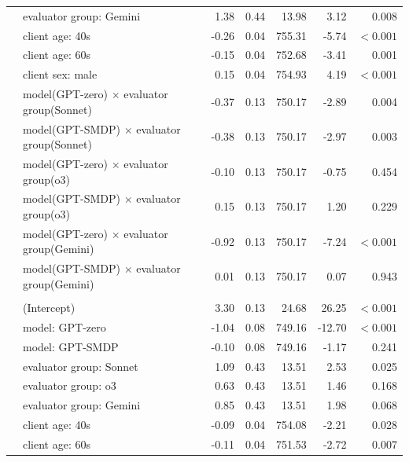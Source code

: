 \documentclass{wiley-article}
\begin{document}
{\begin{longtable}{@{}l p{} rrrrr@{}}
    & evaluator group: Gemini                                 & 1.38 & 0.44 &  13.98 &   3.12 & 0.008 \\
    & client age: 40s                                         &-0.26 & 0.04 & 755.31 &  -5.74 & $<\!0.001$ \\
    & client age: 60s                                         &-0.15 & 0.04 & 752.68 &  -3.41 & 0.001 \\
    & client sex: male                                        & 0.15 & 0.04 & 754.93 &   4.19 & $<\!0.001$ \\
    & model(GPT-zero) $\times$ evaluator group(Sonnet)        &-0.37 & 0.13 & 750.17 &  -2.89 & 0.004 \\
    & model(GPT-SMDP) $\times$ evaluator group(Sonnet)        &-0.38 & 0.13 & 750.17 &  -2.97 & 0.003 \\
    & model(GPT-zero) $\times$ evaluator group(o3)            &-0.10 & 0.13 & 750.17 &  -0.75 & 0.454 \\
    & model(GPT-SMDP) $\times$ evaluator group(o3)            & 0.15 & 0.13 & 750.17 &   1.20 & 0.229 \\
    & model(GPT-zero) $\times$ evaluator group(Gemini)        &-0.92 & 0.13 & 750.17 &  -7.24 & $<\!0.001$ \\
    & model(GPT-SMDP) $\times$ evaluator group(Gemini)        & 0.01 & 0.13 & 750.17 &   0.07 & 0.943 \\
  \addlinespace
  \multicolumn{7}{l}{\textbf{EMP}}\\
    & (Intercept)                                             & 3.30 & 0.13 &  24.68 &  26.25 & $<\!0.001$ \\
    & model: GPT-zero                                         &-1.04 & 0.08 & 749.16 & -12.70 & $<\!0.001$ \\
    & model: GPT-SMDP                                         &-0.10 & 0.08 & 749.16 &  -1.17 & 0.241 \\
    & evaluator group: Sonnet                                 & 1.09 & 0.43 &  13.51 &   2.53 & 0.025 \\
    & evaluator group: o3                                     & 0.63 & 0.43 &  13.51 &   1.46 & 0.168 \\
    & evaluator group: Gemini                                 & 0.85 & 0.43 &  13.51 &   1.98 & 0.068 \\
    & client age: 40s                                         &-0.09 & 0.04 & 754.08 &  -2.21 & 0.028 \\
    & client age: 60s                                         &-0.11 & 0.04 & 751.53 &  -2.72 & 0.007 \\

\end{longtable}}
\end{document}

